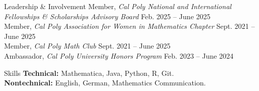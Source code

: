 \documentclass[
	11pt, %
]{cv} %
\begin{document}

\begin{rSection}{Leadership \& Involvement}
	Member, \textit{Cal Poly National and International Fellowships \& Scholarships Advisory Board} \dotfill Feb. 2025 -- June 2025 \\
	Member, \textit{Cal Poly Association for Women in Mathematics Chapter} \dotfill Sept. 2021 -- June 2025 \\
	Member, \textit{Cal Poly Math Club} \dotfill Sept. 2021 -- June 2025 \\
	Ambassador, \textit{Cal Poly University Honors Program} \dotfill Feb. 2023 -- June 2024
\end{rSection}

\begin{rSection}{Skills}
	\textbf{Technical: } Mathematica, Java, Python, R, Git.\\
	\textbf{Nontechnical: } English, German, Mathematics Communication.
\end{rSection}
\end{document}
